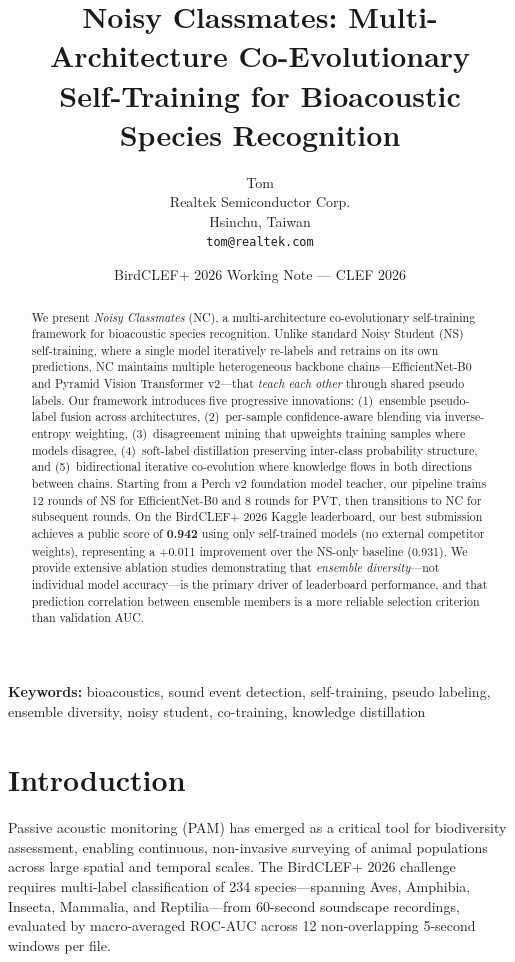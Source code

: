 \documentclass[a4paper]{article}
\title{\textbf{Noisy Classmates: Multi-Architecture Co-Evolutionary\\Self-Training for Bioacoustic Species Recognition}}
\author{
  Tom\\
  Realtek Semiconductor Corp.\\
  Hsinchu, Taiwan\\
  \texttt{tom@realtek.com}
}
\date{BirdCLEF+ 2026 Working Note — CLEF 2026}
\begin{document}
\maketitle

\begin{abstract}
We present \emph{Noisy Classmates} (NC), a multi-architecture co-evolutionary self-training framework for bioacoustic species recognition.
Unlike standard Noisy Student (NS) self-training, where a single model iteratively re-labels and retrains on its own predictions,
NC maintains multiple heterogeneous backbone chains---EfficientNet-B0 and Pyramid Vision Transformer v2---that \emph{teach each other} through shared pseudo labels.
Our framework introduces five progressive innovations:
(1)~ensemble pseudo-label fusion across architectures,
(2)~per-sample confidence-aware blending via inverse-entropy weighting,
(3)~disagreement mining that upweights training samples where models disagree,
(4)~soft-label distillation preserving inter-class probability structure, and
(5)~bidirectional iterative co-evolution where knowledge flows in both directions between chains.
Starting from a Perch v2 foundation model teacher, our pipeline trains 12 rounds of NS for EfficientNet-B0 and 8 rounds for PVT, then transitions to NC for subsequent rounds.
On the BirdCLEF+ 2026 Kaggle leaderboard, our best submission achieves a public score of \textbf{0.942} using only self-trained models (no external competitor weights), representing a +0.011 improvement over the NS-only baseline (0.931).
We provide extensive ablation studies demonstrating that \emph{ensemble diversity}---not individual model accuracy---is the primary driver of leaderboard performance, and that prediction correlation between ensemble members is a more reliable selection criterion than validation AUC.
\end{abstract}

\textbf{Keywords:} bioacoustics, sound event detection, self-training, pseudo labeling, ensemble diversity, noisy student, co-training, knowledge distillation

\section{Introduction}
\label{sec:intro}

Passive acoustic monitoring (PAM) has emerged as a critical tool for biodiversity assessment, enabling continuous, non-invasive surveying of animal populations across large spatial and temporal scales.
The BirdCLEF+ 2026 challenge~\citep{birdclef2026} requires multi-label classification of 234 species---spanning Aves, Amphibia, Insecta, Mammalia, and Reptilia---from 60-second soundscape recordings, evaluated by macro-averaged ROC-AUC across 12 non-overlapping 5-second windows per file.
\end{document}
